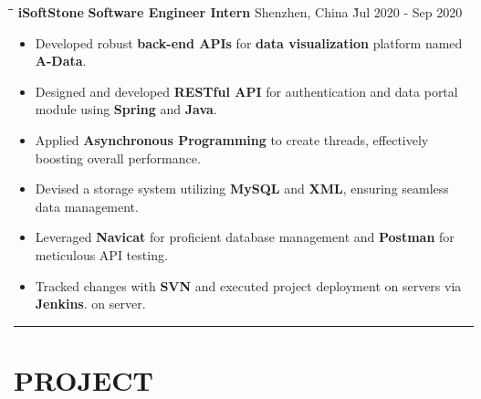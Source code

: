 \documentclass{res}
\begin{document}
\begin{resume}
    \vspace{-0.05in}	
    \begin{tabbing}
    \hspace{2.3in}\= \hspace{2.2in}\= \hspace{1.6in}\= \kill %
    {\bf iSoftStone} \> {\bf Software Engineer Intern}  \>  
                                    Shenzhen, China   \` Jul 2020 - Sep 2020\\
    \end{tabbing}\vspace{-20pt}      %
    \vspace{+0.1in}
    \begin{itemize} \itemsep 1.5pt %
        \item Developed robust {\bf back-end APIs} for {\bf data visualization} 
            platform named {\bf A-Data}.
        \item Designed and developed {\bf RESTful API} for authentication and 
                data portal module using {\bf Spring} and {\bf Java}.
        \item Applied {\bf Asynchronous Programming} to create threads, effectively boosting overall performance.
        \item Devised a storage system utilizing {\bf MySQL} and {\bf XML}, ensuring seamless data management.
        \item Leveraged {\bf Navicat} for proficient database management and {\bf Postman} for meticulous API testing.
        \item Tracked changes with {\bf SVN} and executed project deployment on servers via {\bf Jenkins}.
                on server.
    \end{itemize}

\vspace{+0.05in}

\vspace{-8pt}
\hspace{-0.55in}
\noindent\rule[0.25\baselineskip]{19.36cm}{0.5pt}    
        
\vspace{-0.2in}
\section{PROJECT}


\end{resume}
\end{document}
